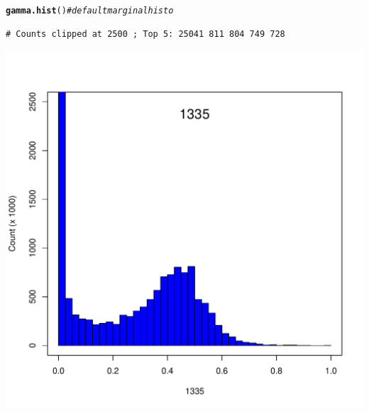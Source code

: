 \documentclass{article}\usepackage[]{graphicx}\usepackage[]{color}
\makeatletter
\def\maxwidth{ %
  \ifdim\Gin@nat@width>\linewidth
    \linewidth
  \else
    \Gin@nat@width
  \fi
}
\newcommand{\hlcom}[1]{\textcolor[rgb]{0.678,0.584,0.686}{\textit{#1}}}%
\newcommand{\hlstd}[1]{\textcolor[rgb]{0.345,0.345,0.345}{#1}}%
\newcommand{\hlkwd}[1]{\textcolor[rgb]{0.737,0.353,0.396}{\textbf{#1}}}%
\newenvironment{kframe}{%
 \def\at@end@of@kframe{}%
 \ifinner\ifhmode%
  \def\at@end@of@kframe{\end{minipage}}%
  \begin{minipage}{\columnwidth}%
 \fi\fi%
 \def\FrameCommand##1{\hskip\@totalleftmargin \hskip-\fboxsep
 \colorbox{shadecolor}{##1}\hskip-\fboxsep
     \hskip-\linewidth \hskip-\@totalleftmargin \hskip\columnwidth}%
 \MakeFramed {\advance\hsize-\width
   \@totalleftmargin\z@ \linewidth\hsize
   \@setminipage}}%
 {\par\unskip\endMakeFramed%
 \at@end@of@kframe}
\newenvironment{knitrout}{}{} %
\makeatother
\begin{document}
\begin{knitrout}\footnotesize
{}\color{fgcolor}\begin{kframe}
\begin{alltt}
\hlkwd{gamma.hist}\hlstd{()} \hlcom{# default marginal histo}
\end{alltt}
\begin{verbatim}
# Counts clipped at 2500 ; Top 5: 25041 811 804 749 728
\end{verbatim}
\end{kframe}
\includegraphics[width=\maxwidth]{Fig1-mscat-figs/unnamed-chunk-20-1} 

\end{knitrout}
\end{document}
